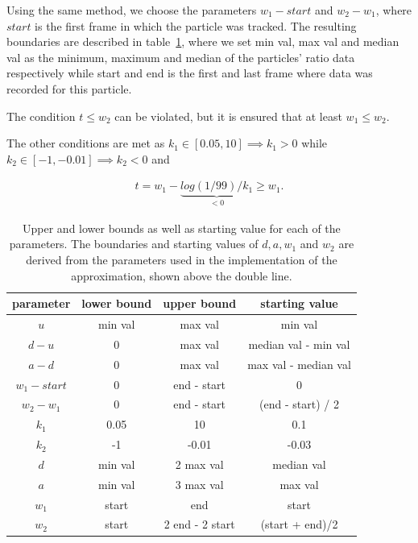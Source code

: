 Using the same method, we choose the parameters $w_1 - start$ and $w_2 - w_1$, where $start$ is the first frame in which the particle was tracked. The resulting boundaries are described in table~\ref{tab:boundaries_and_starting_vals}, where we set min val, max val and median val as the minimum, maximum and median of the particles' ratio data respectively while start and end is the first and last frame where data was recorded for this particle.

The condition $t \leq w_2$ can be violated, but it is ensured that at least $w_1 \leq w_2$.

The other conditions are met as $k_1 \in [0.05, 10] \implies k_1 > 0$ while $k_2 \in [-1, -0.01] \implies k_2 < 0$ and

\begin{align*}
	t = w_1 - \underbrace{log(1/99) / k_1}_{< 0} \geq w_1.
\end{align*}

\begin{table}[h!]
	\centering
	\begin{tabular}{|c|c|c|c|}
		\hline
		\textbf{parameter} & \textbf{lower bound} & \textbf{upper bound} & \textbf{starting value} \\ 
		\hline
		$u$ & min val & max val & min val\\
		\hline
		$d - u$ & 0 & max val & median val - min val\\
		\hline
		$a - d$ & 0 & max val & max val - median val\\
		\hline
		$w_1 - start$ & 0 & end - start & 0\\
		\hline
		$w_2 - w_1$ & 0 & end - start & (end - start) / 2\\
		\hline
		$k_1$ & 0.05 & 10 & 0.1\\
		\hline
		$k_2$ & -1 & -0.01 & -0.03\\
		\hline
		\hline
		$d$ & min val & 2 max val & median val \\
		\hline
		$a$ & min val & 3 max val & max val \\
		\hline
		$w_1$ & start & end & start \\
		\hline
		$w_2$ & start & 2 end - 2 start & (start + end)/2\\
		\hline
	\end{tabular}
	\caption{Upper and lower bounds as well as starting value for each of the parameters. The boundaries and starting values of $d, a, w_1$ and $w_2$ are derived from the parameters used in the implementation of the approximation, shown above the double line.}
	\label{tab:boundaries_and_starting_vals}
\end{table}

